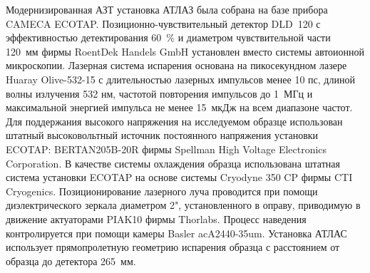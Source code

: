Модернизированная АЗТ установка АТЛАЗ была собрана на базе прибора CAMECA ECOTAP. Позиционно-чувствительный детектор DLD~120 с эффективностью детектирования 60~$\%$ и диаметром чувствительной части 120~мм фирмы RoentDek Handels GmbH установлен вместо системы автоионной микроскопии. Лазерная система испарения основана на пикосекундном лазере Huaray Olive-532-15 с длительностью лазерных импульсов менее 10 пс, длиной волны излучения 532 нм, частотой повторения импульсов до 1~МГц и максимальной энергией импульса не менее 15~мкДж на всем диапазоне частот. Для поддержания высокого напряжения на исследуемом образце использован штатный высоковольтный источник постоянного напряжения установки ECOTAP: BERTAN205B-20R фирмы Spellman High Voltage Electronics Corporation. В качестве системы охлаждения образца использована штатная система установки ECOTAP на основе системы Cryodyne 350 CP фирмы CTI Cryogenics. Позиционирование лазерного луча проводится при помощи диэлектрического зеркала диаметром 2", установленного в оправу, приводимую в движение актуаторами PIAK10 фирмы Thorlabs. Процесс наведения контролируется при помощи камеры Basler acA2440-35um. Установка АТЛАС использует прямопролетную геометрию испарения образца с расстоянием от образца до детектора 265~мм.

